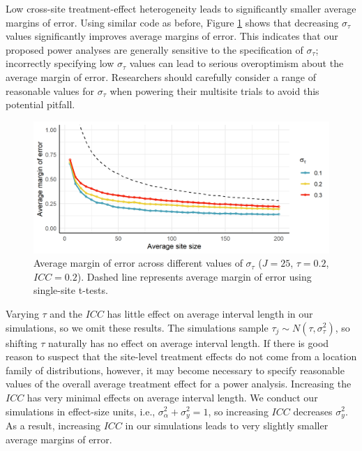 \documentclass[]{article}
\begin{document}
Low cross-site treatment-effect heterogeneity leads to significantly smaller average margins of error.
Using similar code as before, Figure \ref{fig:results_txsd} shows that decreasing $\sigma_\tau$ values significantly improves average margins of error.
This indicates that our proposed power analyses are generally sensitive to the specification of $\sigma_\tau$;
incorrectly specifying low $\sigma_\tau$ values can lead to serious overoptimism about the average margin of error.
Researchers should carefully consider a range of reasonable values for $\sigma_\tau$ when powering their multisite trials to avoid this potential pitfall.
\begin{figure}[t]
	\centering
	\includegraphics[width=\textwidth]{simstudy_txsd_length}
	\caption{Average margin of error across different values of $\sigma_\tau$ ($J=25$, $\tau=0.2$, $ICC=0.2$).
	    Dashed line represents average margin of error using single-site t-tests.}
	\label{fig:results_txsd}
\end{figure}

Varying $\tau$ and the $ICC$ has little effect on average interval length in our simulations, so we omit these results.
The simulations sample $\tau_j \sim N(\tau, \sigma_\tau^2)$, so shifting $\tau$ naturally has no effect on average interval length.
If there is good reason to suspect that the site-level treatment effects do not come from a location family of distributions, however, it may become necessary to specify reasonable values of the overall average treatment effect for a power analysis.
Increasing the $ICC$ has very minimal effects on average interval length.
We conduct our simulations in effect-size units, i.e., $\sigma^2_\alpha + \sigma^2_y = 1$, so increasing $ICC$ decreases $\sigma^2_y$.
As a result, increasing $ICC$ in our simulations leads to very slightly smaller average margins of error.
\end{document}
